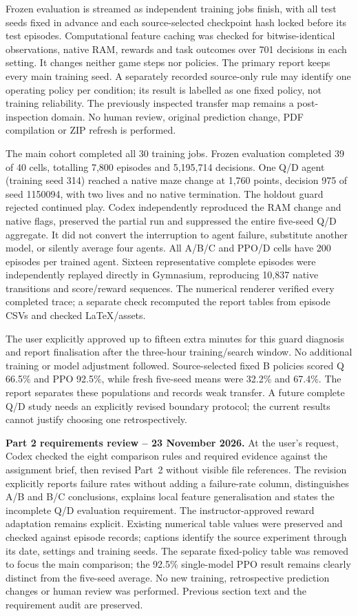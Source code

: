Frozen evaluation is streamed as independent training jobs finish, with all
test seeds fixed in advance and each source-selected checkpoint hash locked
before its test episodes. Computational feature caching was checked for
bitwise-identical observations, native RAM, rewards and task outcomes over
701 decisions in each setting. It changes neither game steps nor policies.
The primary report keeps every main training seed. A separately recorded
source-only rule may identify one operating policy per condition; its result
is labelled as one fixed policy, not training reliability. The previously
inspected transfer map remains a post-inspection domain. No human review,
original prediction change, PDF compilation or ZIP refresh is performed.

\medskip
The main cohort completed all 30 training jobs. Frozen evaluation completed
39 of 40 cells, totalling 7,800 episodes and 5,195,714 decisions. One Q/D
agent (training seed 314) reached a native maze change at 1,760 points,
decision 975 of seed 1150094, with two lives and no native termination.
The holdout guard rejected continued play. Codex independently reproduced
the RAM change and native flags, preserved the partial run and suppressed
the entire five-seed Q/D aggregate. It did not convert the interruption to
agent failure, substitute another model, or silently average four agents.
All A/B/C and PPO/D cells have 200 episodes per trained agent. Sixteen
representative complete episodes were independently replayed directly in
Gymnasium, reproducing 10,837 native transitions and score/reward sequences.
The numerical renderer verified every completed trace; a separate check
recomputed the report tables from episode CSVs and checked LaTeX/assets.

The user explicitly approved up to fifteen extra minutes for this guard
diagnosis and report finalisation after the three-hour training/search window.
No additional training or model adjustment followed. Source-selected fixed
B policies scored Q 66.5\% and PPO 92.5\%, while fresh five-seed means were
32.2\% and 67.4\%. The report separates these populations and records weak
transfer. A future complete Q/D study needs an explicitly revised boundary
protocol; the current results cannot justify choosing one retrospectively.

\medskip
\noindent\textbf{Part 2 requirements review -- 23 November 2026.}
At the user's request, Codex checked the eight comparison rules and required
evidence against the assignment brief, then revised Part~2 without visible
file references. The revision explicitly reports failure rates without adding
a failure-rate column, distinguishes A/B and B/C conclusions, explains local
feature generalisation and states the incomplete Q/D evaluation requirement.
The instructor-approved reward adaptation remains explicit. Existing numerical
table values were preserved and checked against episode records; captions
identify the source experiment through its date, settings and training seeds.
The separate fixed-policy table was removed to focus the main comparison;
the 92.5\% single-model PPO result remains clearly distinct from the five-seed
average. No new training, retrospective prediction changes or human review
was performed. Previous section text and the requirement audit are preserved.

